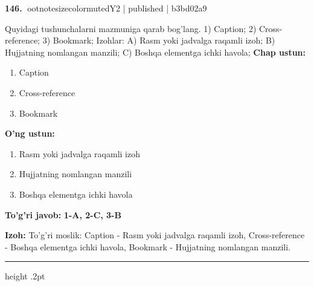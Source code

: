 \documentclass[10pt,a4paper]{article}
\begin{document}
\textbf{\color{ink}146.} {ootnotesizecolor{muted}Y2 | published | b3bd02a9}
\par
Quyidagi tushunchalarni mazmuniga qarab bog'lang.  1) Caption;  2) Cross-reference;  3) Bookmark;  Izohlar: A) Rasm yoki jadvalga raqamli izoh;  B) Hujjatning nomlangan manzili;  C) Boshqa elementga ichki havola;
\textbf{Chap ustun:}\begin{enumerate}[label=\arabic*),leftmargin=9mm]
\item Caption
\item Cross-reference
\item Bookmark
\end{enumerate}
\textbf{O'ng ustun:}\begin{enumerate}[label=\Alph*),leftmargin=9mm]
\item Rasm yoki jadvalga raqamli izoh
\item Hujjatning nomlangan manzili
\item Boshqa elementga ichki havola
\end{enumerate}
\begin{tcolorbox}[enhanced,breakable,colback=teal!4,colframe=teal!55!black,boxrule=0.45pt,arc=1.2mm,left=2.8mm,right=2.8mm,top=2mm,bottom=2mm]
\textbf{\color{teal}To'g'ri javob:} \textbf{1-A, 2-C, 3-B}
\par\smallskip
\textbf{Izoh:} To'g'ri moslik: Caption - Rasm yoki jadvalga raqamli izoh, Cross-reference - Boshqa elementga ichki havola, Bookmark - Hujjatning nomlangan manzili.
\end{tcolorbox}
\vspace{2mm}\hrule height .2pt\vspace{2mm}
\end{document}
